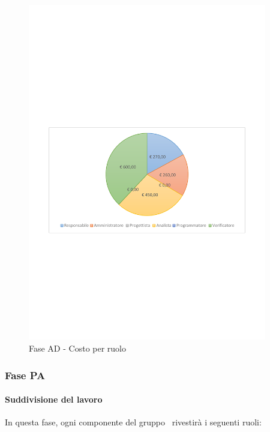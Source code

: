 \documentclass[../PianoProgetto.tex]{subfiles}
\begin{document}
	\begin{figure}[!h]
		\centering
		\includegraphics[width=0.93\textwidth , trim=2cm 9.5cm 2cm 11cm]{grafici/AD/AD-costo}
			\caption{Fase AD - Costo per ruolo}
		\label{fig:CircleChart-faseAD_costo}
	\end{figure}
\vfill		
\newpage	
	\subsubsection{Fase PA}
				\paragraph{Suddivisione del lavoro}
					In questa fase\g, ogni componente del gruppo \leaf\ rivestirà i seguenti ruoli:
	
\end{document}
